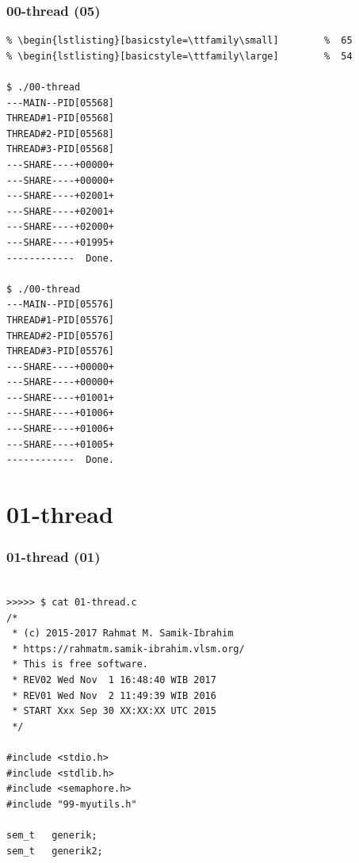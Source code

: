 \documentclass[aspectratio=169, xcolor=table, notheorems, hyperref={pdfpagelabels=false}]{beamer}
\begin{document}
\begin{frame}[fragile]
\frametitle{00-thread (05)}
\begin{lstlisting}[basicstyle=\ttfamily\tiny]         % 108
% \begin{lstlisting}[basicstyle=\ttfamily\footnotesize] %  72
% \begin{lstlisting}[basicstyle=\ttfamily\small]        %  65
% \begin{lstlisting}[basicstyle=\ttfamily\large]        %  54

$ ./00-thread 
---MAIN--PID[05568]
THREAD#1-PID[05568]
THREAD#2-PID[05568]
THREAD#3-PID[05568]
---SHARE----+00000+
---SHARE----+00000+
---SHARE----+02001+
---SHARE----+02001+
---SHARE----+02000+
---SHARE----+01995+
------------  Done.

$ ./00-thread 
---MAIN--PID[05576]
THREAD#1-PID[05576]
THREAD#2-PID[05576]
THREAD#3-PID[05576]
---SHARE----+00000+
---SHARE----+00000+
---SHARE----+01001+
---SHARE----+01006+
---SHARE----+01006+
---SHARE----+01005+
------------  Done.

\end{lstlisting}
\end{frame}

\section{01-thread}
\begin{frame}[fragile]
\frametitle{01-thread (01)}
\begin{lstlisting}[basicstyle=\ttfamily\footnotesize]

>>>>> $ cat 01-thread.c
/*
 * (c) 2015-2017 Rahmat M. Samik-Ibrahim
 * https://rahmatm.samik-ibrahim.vlsm.org/
 * This is free software.
 * REV02 Wed Nov  1 16:48:40 WIB 2017
 * REV01 Wed Nov  2 11:49:39 WIB 2016
 * START Xxx Sep 30 XX:XX:XX UTC 2015
 */

#include <stdio.h>
#include <stdlib.h>
#include <semaphore.h>
#include "99-myutils.h"

sem_t	generik;
sem_t	generik2;

\end{lstlisting}
\end{frame}
\end{document}
